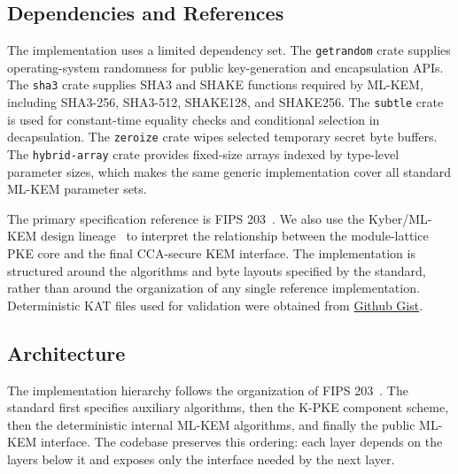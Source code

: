 \subsection{Dependencies and References}

The implementation uses a limited dependency set. The \texttt{getrandom} crate supplies operating-system randomness for public key-generation and encapsulation APIs. The \texttt{sha3} crate supplies SHA3 and SHAKE functions required by ML-KEM, including SHA3-256, SHA3-512, SHAKE128, and SHAKE256. The \texttt{subtle} crate is used for constant-time equality checks and conditional selection in decapsulation. The \texttt{zeroize} crate wipes selected temporary secret byte buffers. The \texttt{hybrid-array} crate provides fixed-size arrays indexed by type-level parameter sizes, which makes the same generic implementation cover all standard ML-KEM parameter sets.

The primary specification reference is FIPS 203~\cite{nist2024fips203}. We also use the Kyber/ML-KEM design lineage~\cite{bos2018crystals} to interpret the relationship between the module-lattice PKE core and the final CCA-secure KEM interface. The implementation is structured around the algorithms and byte layouts specified by the standard, rather than around the organization of any single reference implementation. Deterministic KAT files used for validation were obtained from \href{https://gist.github.com/itzmeanjan/c8f5bc9640d0f0bdd2437dfe364d7710}{Github Gist}.

\subsection{Architecture}

The implementation hierarchy follows the organization of FIPS 203~\cite{nist2024fips203}. The standard first specifies auxiliary algorithms, then the K-PKE component scheme, then the deterministic internal ML-KEM algorithms, and finally the public ML-KEM interface. The codebase preserves this ordering: each layer depends on the layers below it and exposes only the interface needed by the next layer.

